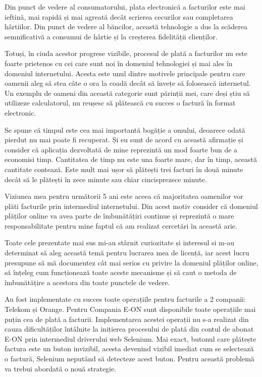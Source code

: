 \documentclass[12pt]{book}
\begin{document}
Din punct de vedere al consumatorului, plata electronică a facturilor este mai ieftină, mai rapidă și mai agreată decât scrierea cecurilor sau completarea hârtiilor. Din punct de vedere al băncilor, această tehnologie a dus la scăderea semnificativă a consumui de hârtie și la creșterea fidelității clienților.

Totuși, în ciuda acestor progrese vizibile, procesul de plată a facturilor nu este foarte prietenos cu cei care sunt noi în domeniul tehnologiei și mai ales în domeniul internetului. Acesta este unul dintre motivele principale pentru care oamenii aleg să stea câte o ora la coadă decât să învețe să folosească internetul. Un exemplu de oameni din această categorie sunt părinții mei, care deși știu să utilizeze calculatorul, nu reușesc să plătească cu succes o factură în format electronic. 

Se spune că timpul este cea mai importantă bogăție a omului, deoarece odată pierdut nu mai poate fi recuperat. Și eu sunt de acord cu această afirmație și consider că  aplicația dezvoltată de mine reprezintă un mod foarte bun de a economisi timp. Cantitatea de timp nu este una foarte mare, dar în timp, această cantitate contează. Este mult mai ușor să plătești trei facturi în două minute decât să le plătești în zece minute sau chiar cincisprezece minute.

Viziunea mea pentru următorii 5 ani este aceea că majoritatea oamenilor vor plăti facturile prin intermediul internetului. Din acest motiv consider că domeniul plăților online va avea parte de îmbunătățiri continue și reprezintă o mare responsabilitate pentru mine faptul că am realizat cercetări în această arie.

Toate cele prezentate mai sus mi-au stârnit curiozitate și interesul si m-au determinat să aleg această temă pentru lucrarea mea de licență, iar acest lucru presupune să mă documentez cât mai serios cu privire la domeniul plăților online, să înțeleg cum funcționează toate aceste mecanisme și să caut o metoda de îmbunătățire a acestora din toate punctele de vedere. 

Au fost implementate cu succes toate operațiile pentru facturile a 2 companii: Telekom și Orange. Pentru Compania E-ON sunt disponibile toate operațiile mai puțin cea de plată a facturii. Implementarea acestei operații nu s-a realizat din cauza dificultăților întâlnite la inițierea procesului de plată din contul de abonat E-ON prin intermediul driverului web Selenium. Mai exact, butonul care plătește factura este un buton invizibil, acesta devenind vizibil imediat cum se selectează o factură, Selenium neputând să detecteze acest buton. Pentru această problemă va trebui abordată o nouă strategie. 
\end{document}
